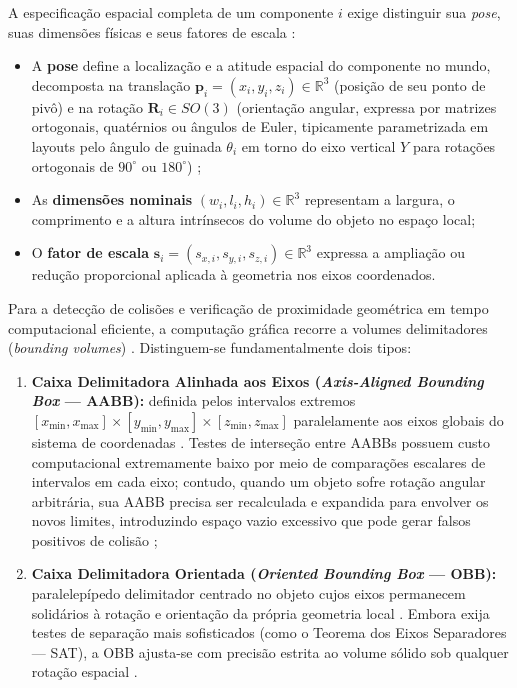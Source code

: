 A especificação espacial completa de um componente $i$ exige distinguir sua \textit{pose}, suas dimensões físicas e seus fatores de escala \cite{ericson2004realtime, xu2025constraint}:
\begin{itemize}
    \item A \textbf{pose} define a localização e a atitude espacial do componente no mundo, decomposta na translação $\mathbf{p}_i = (x_i, y_i, z_i) \in \mathbb{R}^3$ (posição de seu ponto de pivô) e na rotação $\mathbf{R}_i \in SO(3)$ (orientação angular, expressa por matrizes ortogonais, quatérnios ou ângulos de Euler, tipicamente parametrizada em layouts pelo ângulo de guinada $\theta_i$ em torno do eixo vertical $Y$ para rotações ortogonais de $90^\circ$ ou $180^\circ$) \cite{ericson2004realtime, xu2025databasedrivenframework3dlevel};
    \item As \textbf{dimensões nominais} $(w_i, l_i, h_i) \in \mathbb{R}^3$ representam a largura, o comprimento e a altura intrínsecos do volume do objeto no espaço local;
    \item O \textbf{fator de escala} $\mathbf{s}_i = (s_{x,i}, s_{y,i}, s_{z,i}) \in \mathbb{R}^3$ expressa a ampliação ou redução proporcional aplicada à geometria nos eixos coordenados.
\end{itemize}

Para a detecção de colisões e verificação de proximidade geométrica em tempo computacional eficiente, a computação gráfica recorre a volumes delimitadores (\textit{bounding volumes}) \cite{ericson2004realtime, shaker2016constructive, xu2025constraint}. Distinguem-se fundamentalmente dois tipos:
\begin{enumerate}
    \item \textbf{Caixa Delimitadora Alinhada aos Eixos (\textit{Axis-Aligned Bounding Box} --- AABB):} definida pelos intervalos extremos $[x_{\min}, x_{\max}] \times [y_{\min}, y_{\max}] \times [z_{\min}, z_{\max}]$ paralelamente aos eixos globais do sistema de coordenadas \cite{ericson2004realtime}. Testes de interseção entre AABBs possuem custo computacional extremamente baixo por meio de comparações escalares de intervalos em cada eixo; contudo, quando um objeto sofre rotação angular arbitrária, sua AABB precisa ser recalculada e expandida para envolver os novos limites, introduzindo espaço vazio excessivo que pode gerar falsos positivos de colisão \cite{ericson2004realtime};
    \item \textbf{Caixa Delimitadora Orientada (\textit{Oriented Bounding Box} --- OBB):} paralelepípedo delimitador centrado no objeto cujos eixos permanecem solidários à rotação e orientação da própria geometria local \cite{ericson2004realtime}. Embora exija testes de separação mais sofisticados (como o Teorema dos Eixos Separadores --- SAT), a OBB ajusta-se com precisão estrita ao volume sólido sob qualquer rotação espacial \cite{ericson2004realtime}.
\end{enumerate}


